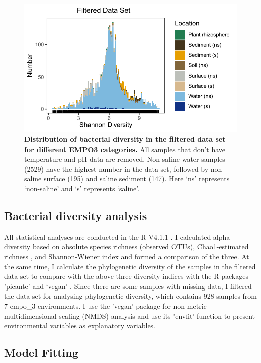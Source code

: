 \documentclass[11pt, a4paper]{article}
\begin{document}
\begin{spacing}{1.5}
\begin{figure}
    \centering
    \includegraphics[scale=1]{./Figures/Filtered_Hist}
    \caption{\textbf{Distribution of bacterial diversity in the filtered data set for different EMPO3 categories.} All samples that don't have temperature and pH data are removed. Non-saline water samples (2529) have the highest number in the data set, followed by non-saline surface (195) and saline sediment (147). Here `ns' represents `non-saline' and `s' represents `saline'.}
    \label{fig:Filtered_Hist}
\end{figure}

\subsection{Bacterial diversity analysis}

All statistical analyses are conducted in the R V4.1.1 \citep{team2013r}. I calculated alpha diversity based on absolute species richness (observed OTUs), Chao1-estimated richness \citep{chao1984nonparametric}, and Shannon-Wiener index \citep{hill2003using} and formed a comparison of the three. At the same time, I calculate the phylogenetic diversity of the samples in the filtered data set to compare with the above three diversity indices with the R packages 'picante' \citep{kembel2010picante} and ‘vegan’ \citep{oksanen2013package}. Since there are some samples with missing data, I filtered the data set for analysing phylogenetic diversity, which contains 928 samples from 7 empo\_3 environments. I use the 'vegan' package \citep{oksanen2013package} for non-metric multidimensional scaling (NMDS) analysis and use its 'envfit' function to present environmental variables as explanatory variables.

\subsection{Model Fitting}


\end{spacing}
\end{document}
